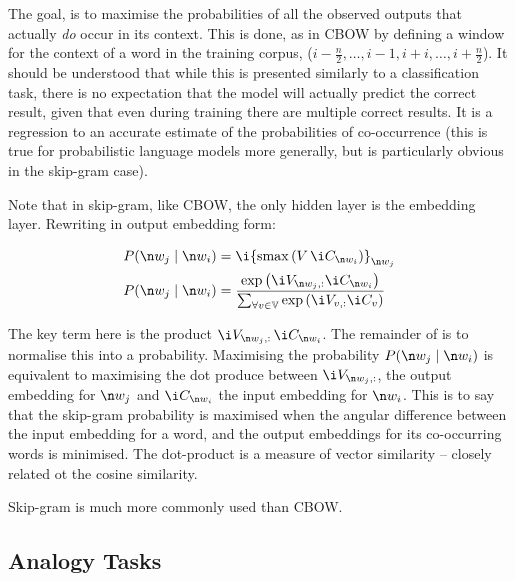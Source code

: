 {The goal, is to maximise the probabilities of all the observed outputs that actually \emph{do} occur in its context.
This is done, as in CBOW by defining a window for the context of a word in the training corpus, ($i-\frac{n}{2},\ldots,i-1, i+i,\ldots,i+\frac{n}{2}$).
It should be understood that while this is presented similarly to a classification task,
there is no expectation that the model will actually predict the correct result,
given that even during training there are multiple correct results.
It is a regression to an accurate estimate of the probabilities of co-occurrence
(this is true for probabilistic language models more generally, but is particularly obvious in the skip-gram case).


Note that in skip-gram, like CBOW, the only hidden layer is the embedding layer.
Rewriting  in output embedding form:

\begin{align}
P(\n w_j \mid \n w_i) & = \i {\softmax \left(V\,\i C_{\n w_i}\right)}_{\n w_j} \\
P(\n w_j \mid \n w_i) & = \frac{\exp{\i V_{\n w_j,:} \i C_{\n w_i}}}{\sum_{\forall v \in \set V} \exp{\i V_{v,:}\i C_{v}}} \label{equ:skipgram-output}
\end{align}

The key term here is the product $\i V_{\n w_j,:}\,\i C_{\n w_i}$.
The remainder of   is to normalise this into a probability.
Maximising the probability $P(\n w_j \mid \n w_i)$ is equivalent to maximising the dot produce between $\i V_{\n w_j,:}$, the output embedding for $\n w_j$ and  $\i C_{\n w_i}$ the input embedding for $\n w_i$.
This is to say that the skip-gram probability is maximised when the angular difference between the input embedding for a word, and the output embeddings for its co-occurring words is minimised.
The dot-product is a measure of vector similarity -- closely related ot the cosine similarity.

Skip-gram is much more commonly used than CBOW.


\subsection{Analogy Tasks}



}
